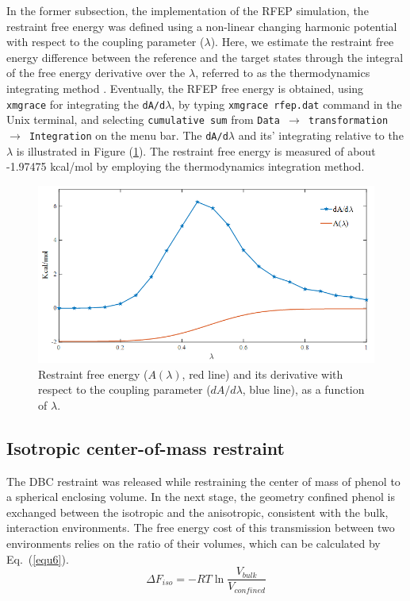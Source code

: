 \documentclass[9pt,tutorial]{livecoms}
\begin{document}
In the former subsection, the implementation of the RFEP simulation, the restraint free energy was defined using a non-linear changing harmonic potential with respect to the coupling parameter ({$\lambda$}). Here, we estimate the restraint free energy difference between the reference and the target states through the integral of the free energy derivative over the {$\lambda$}, referred to as the thermodynamics integrating method \cite{Kirkwood1935,frenkel2001understanding}. Eventually, the RFEP free energy is obtained, using \texttt{xmgrace} for integrating the \texttt{dA/d$\lambda$}, by typing \texttt{xmgrace rfep.dat} command in the Unix terminal, and selecting \texttt{cumulative sum} from \texttt{Data  {$\rightarrow$} transformation {$\rightarrow$} Integration} on the menu bar. The \texttt{dA/d{$\lambda$}} and its’ integrating relative to the {$\lambda$} is illustrated in Figure (\ref{fig:RFEP2}). The restraint free energy is measured of about -1.97475 kcal/mol by employing the thermodynamics integration method. 
\begin{figure}[h!t]
\centering
\includegraphics[width=\linewidth]{RFEP}
\caption{Restraint free energy ($A(\lambda)$, red line) and its derivative with respect to the coupling parameter ($dA/d\lambda$, blue line), as a function of {$\lambda$}.}
\label{fig:RFEP2}
\end{figure}


\subsection{Isotropic center-of-mass restraint}

The DBC restraint was released while restraining the center of mass of phenol to a spherical enclosing volume. In the next stage, the geometry confined phenol is exchanged between the isotropic and the anisotropic, consistent with the bulk, interaction environments. The free energy cost of this transmission between two environments relies on the ratio of their volumes, which can be calculated by Eq.~(\ref{equ6}).
\begin{equation}\label{equ6}
\Delta F_{iso}=-RT\ln{\frac{V_{bulk}}{V_{confined}}}
\end{equation}
\end{document}
